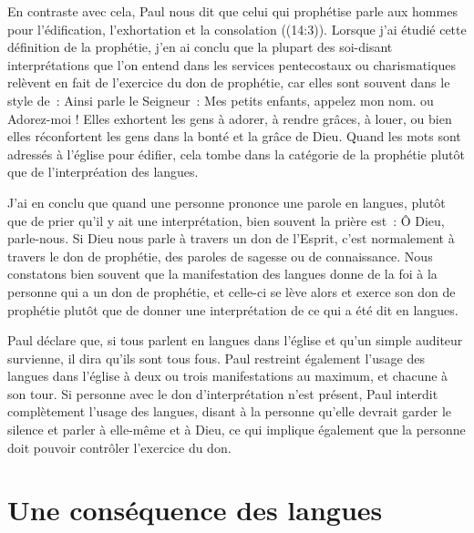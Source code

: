 En contraste avec cela, Paul nous dit que celui qui prophétise
 parle aux hommes pour l'édification, l'exhortation et la consolation
 ((14:3)). Lorsque j'ai étudié cette définition
 de la prophétie, j'en ai conclu que la plupart des soi-disant
 interprétations que l'on entend dans les services pentecostaux
 ou charismatiques relèvent en fait de l'exercice du don de prophétie,
 car elles sont souvent dans le style de~: \og Ainsi parle le Seigneur~:
 \og Mes petits enfants, appelez mon nom. \fg{} ou \og Adorez-moi ! \fg{}
 Elles exhortent les gens à adorer, à rendre grâces, à louer,
 ou bien elles réconfortent les gens dans la bonté et la grâce de Dieu.
 Quand les mots sont adressés à l'église pour édifier, cela tombe
 dans la catégorie de la prophétie plutôt que de l'interpréation des langues.

J'ai en conclu que quand une personne prononce une parole en langues,
 plutôt que de prier qu'il y ait une interprétation, bien souvent
 la prière est~: \og Ô Dieu, parle-nous. \fg{}
 Si Dieu nous parle à travers un don de l'Esprit, c'est normalement
 à travers le don de prophétie, des paroles de sagesse ou de connaissance.
 Nous constatons bien souvent que la manifestation des langues donne de la foi
 à la personne qui a un don de prophétie, et celle-ci se lève alors et exerce son don
 de prophétie plutôt que de donner une interprétation de ce qui a été dit
 en langues.

Paul déclare que, si tous parlent en langues dans l'église et qu'un simple
 auditeur survienne, il dira qu'ils sont tous fous.
 Paul restreint également l'usage des langues dans l'église à deux ou trois
 manifestations au maximum, et chacune à son tour.
 Si personne avec le don d'interprétation n'est présent, Paul interdit
 complètement l'usage des langues, disant à la personne qu'elle devrait
 garder le silence et parler à elle-même et à Dieu,
 ce qui implique également que la personne doit pouvoir contrôler
 l'exercice du don.


\section{Une cons\'equence des langues}


